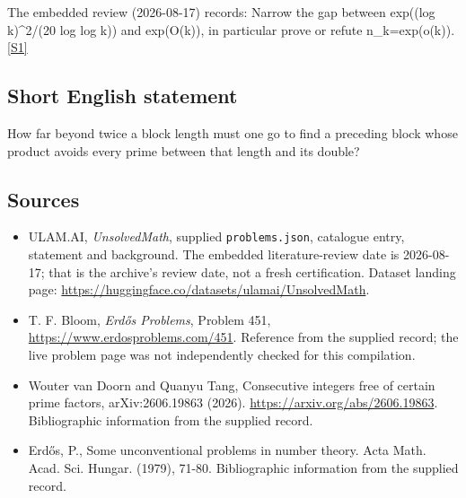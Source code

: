 \documentclass[11pt,a4paper]{article}
\newcommand{\sref}[2]{\hyperlink{source:#1:#2}{[S#2]}}
\begin{document}
The embedded review (2026-08-17) records: Narrow the gap between exp((log k)\textasciicircum{}2/(20 log log k)) and exp(O(k)), in particular prove or refute n\_k=exp(o(k)). \sref{statement}{1}

\subsection{Short English statement}

How far beyond twice a block length must one go to find a preceding block whose product avoids every prime between that length and its double?

\subsection{Sources}

{\small

\begin{itemize}

\item[\hypertarget{source:statement:1}{S1}] ULAM.AI, \emph{UnsolvedMath}, supplied \texttt{problems.json}, catalogue entry, statement and background. The embedded literature-review date is 2026-08-17; that is the archive’s review date, not a fresh certification. Dataset landing page: \url{https://huggingface.co/datasets/ulamai/UnsolvedMath}.

\item[\hypertarget{source:statement:2}{S2}] T. F. Bloom, \emph{Erdős Problems}, Problem 451, \url{https://www.erdosproblems.com/451}. Reference from the supplied record; the live problem page was not independently checked for this compilation.

\item[\hypertarget{source:statement:3}{S3}] Wouter van Doorn and Quanyu Tang, Consecutive integers free of certain prime factors, arXiv:2606.19863 (2026). \url{https://arxiv.org/abs/2606.19863}. Bibliographic information from the supplied record.

\item[\hypertarget{source:statement:4}{S4}] Erd\H{o}s, P., Some unconventional problems in number theory. Acta Math. Acad. Sci. Hungar. (1979), 71-80. Bibliographic information from the supplied record.

\end{itemize}

}

\label{end:statement}
\end{document}
